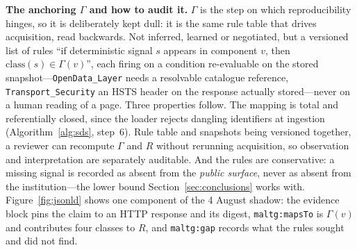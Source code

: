 \documentclass[engproc,proceedingpaper,submit,moreauthors]{Definitions/mdpi}
\begin{document}
    \textbf{The anchoring $\Gamma$ and how to audit it.}
    $\Gamma$ is the step on which reproducibility hinges, so it is deliberately kept dull: it is the same rule table that drives acquisition, read backwards. Not inferred, learned or negotiated, but a versioned list of rules ``if deterministic signal $s$ appears in component $v$, then $\mathrm{class}(s)\in\Gamma(v)$'', each firing on a condition re-evaluable on the stored snapshot---\texttt{OpenData\_Layer} needs a resolvable catalogue reference, \texttt{Transport\_Security} an HSTS header on the response actually stored---never on a human reading of a page. Three properties follow. The mapping is total and referentially closed, since the loader rejects dangling identifiers at ingestion (Algorithm~\ref{alg:sds}, step~6). Rule table and snapshots being versioned together, a reviewer can recompute $\Gamma$ and $R$ without rerunning acquisition, so observation and interpretation are separately auditable. And the rules are conservative: a missing signal is recorded as absent from the \emph{public surface}, never as absent from the institution---the lower bound Section~\ref{sec:conclusions} works with. Figure~\ref{fig:jsonld} shows one component of the 4 August shadow: the evidence block pins the claim to an HTTP response and its digest, \texttt{maltg:mapsTo} is $\Gamma(v)$ and contributes four classes to $R$, and \texttt{maltg:gap} records what the rules sought and did not find.
\end{document}
